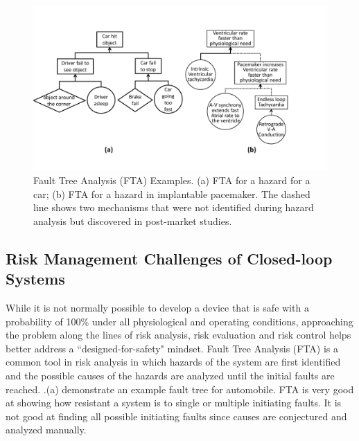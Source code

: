 \begin{figure}[t]
		\centering
		\includegraphics[width=\textwidth]{figs/fta_new.pdf}
		\caption{\small Fault Tree Analysis (FTA) Examples. (a) FTA for a hazard for a car; (b) FTA for a hazard in implantable pacemaker. The dashed line shows two mechanisms that were not identified during hazard analysis but discovered in post-market studies.}
		\label{fig:risks}
\end{figure}
\subsection{Risk Management Challenges of Closed-loop Systems}
While it is not normally possible to develop a device that is safe with a probability of 100\% under all physiological and operating conditions, approaching the problem along the lines of risk analysis, risk evaluation and risk control helps better address a ``designed-for-safety" mindset. Fault Tree Analysis (FTA) is a common tool in risk analysis in which hazards of the system are first identified and the possible causes of the hazards are analyzed until the initial faults are reached. .(a) demonstrate an example fault tree for automobile. FTA is very good at showing how resistant a system is to single or multiple initiating faults. It is not good at finding all possible initiating faults since causes are conjectured and analyzed manually. 

